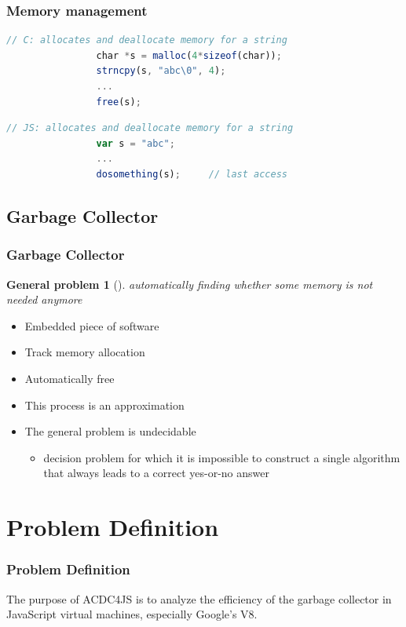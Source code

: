 \documentclass[xcolor=x11names,compress]{beamer}
\begin{document}
	\begin{frame}[fragile]
		\frametitle{Memory management}
			\begin{lstlisting}[language=JavaScript]
				// C: allocates and deallocate memory for a string
				char *s = malloc(4*sizeof(char));
				strncpy(s, "abc\0", 4);
				...
				free(s);
			\end{lstlisting}			
			
			\pause
			
			\begin{lstlisting}[language=JavaScript]
				// JS: allocates and deallocate memory for a string
				var s = "abc";
				...
				dosomething(s);		// last access
			\end{lstlisting}	
			
	\end{frame}
	
	\subsection{Garbage Collector} 
	\begin{frame}
		\frametitle{Garbage Collector}
		\newtheorem{general problem}{General problem}
		\begin{general problem}[] \label{gp:garbage_collector}
			automatically finding whether some memory is not needed anymore
		\end{general problem}
		
		\begin{itemize}
			\item Embedded piece of software
			\item Track memory allocation
			\item Automatically free  
			\item This process is an approximation
			\item The general problem is undecidable
			\begin{itemize}
				\item decision problem for which it is impossible to construct a single algorithm that always leads to a correct yes-or-no answer
			\end{itemize}
		\end{itemize}
	\end{frame}
	
	\section{Problem Definition} 
	\begin{frame}
		\frametitle{Problem Definition}
		The purpose of ACDC4JS is to analyze the efficiency of the garbage collector in JavaScript virtual machines, especially Google's V8.
	\end{frame}
	
\end{document}
